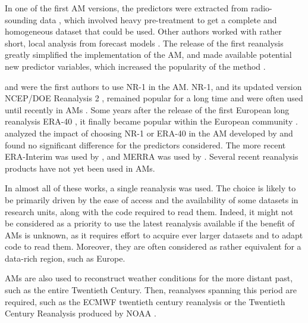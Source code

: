 \documentclass[smallextended]{svjour3}       %
\begin{document}
	In one of the first AM versions, the predictors were extracted from radio-sounding data \citep{Duband1981}, which involved heavy pre-treatment to get a complete and homogeneous dataset that could be used. Other authors worked with rather short, local analysis from forecast models \cite[for example][]{Kruizinga1983, VandenDool1989}. The release of the first reanalysis \citep[NCEP/NCAR Reanalysis I, NR-1 --][]{Kalnay1996, Kistler2001} greatly simplified the implementation of the AM, and made available potential new predictor variables, which increased the popularity of the method \citep{Timbal2008a}.
	
	\citet{Timbal2003} and \citet{Bontron2004} were the first authors to use NR-1 in the AM. NR-1, and its updated version NCEP/DOE Reanalysis 2 \citep[NR-2 --][]{Kanamitsu2002}, remained popular for a long time and were often used until recently in AMs \citep{Wetterhall2005a, Gangopadhyay2005, Altava-Ortiz2006, Barrera2007, Cannon2007, Matulla2007, Bliefernicht2007, Maurer2008, Wu2012, Marty2012, Teng2012, Horton2012, Yiou2014}. Some years after the release of the first European long reanalysis ERA-40 \citep{Uppala2005}, it finally became popular within the European community \citep {Willems2011b, JakobThemessl2011a, BenDaoud2011, Turco2011a, Franke2011, Pascual2012b, Schenk2012, Ribalaygua2013a, Osca2013, Radanovics2013, Martin2014b, Chardon2014, BenDaoud2016}. \citet{BenDaoud2009} analyzed the impact of choosing NR-1 or ERA-40 in the AM developed by \citet{Bontron2004} and found no significant difference for the predictors considered. The more recent ERA-Interim \citep[ERA-INT, ][]{Dee2011a} was used by \cite{Raynaud2016b}, and MERRA \citep{Rienecker2011} was used by \citet{Vanvyve2015}. Several recent reanalysis products have not yet been used in AMs.
	
	In almost all of these works, a single reanalysis was used. The choice is likely to be primarily driven by the ease of access and the availability of some datasets in research units, along with the code required to read them. Indeed, it might not be considered as a priority to use the latest reanalysis available if the benefit of AMs is unknown, as it requires effort to acquire ever larger datasets and to adapt code to read them. Moreover, they are often considered as rather equivalent for a data-rich region, such as Europe.
	
	AMs are also used to reconstruct weather conditions for the more distant past, such as the entire Twentieth Century. Then, reanalyses spanning this period are required, such as the ECMWF twentieth century reanalysis \citep[ERA-20C --][]{Poli2016} or the Twentieth Century Reanalysis \citep[20CR --][]{Compo2011} produced by NOAA \citep[for example,][]{Kuentz2015, Caillouet2016, Brigode2016, Bonnet2017}. 
	
\end{document}
